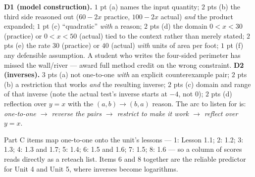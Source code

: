 \documentclass[10pt]{article}
\begin{document}
\begin{teachernote}
\textbf{D1 (model construction).} $1$ pt (a) names the input quantity;
$2$ pts (b) the third side reasoned out ($60 - 2x$ practice, $100 - 2x$ actual)
\emph{and} the product expanded; $1$ pt (c) ``quadratic'' \emph{with} a reason;
$2$ pts (d) the domain $0 < x < 30$ (practice) or $0 < x < 50$ (actual) tied to
the context rather than merely stated; $2$ pts (e) the rate $30$ (practice) or
$40$ (actual) \emph{with} units of area per foot; $1$ pt (f) any defensible
assumption. A student who writes the four-sided perimeter has missed the
wall/river --- award full method credit on the wrong constraint.
\smallskip
\textbf{D2 (inverses).} $3$ pts (a) not one-to-one \emph{with} an explicit
counterexample pair; $2$ pts (b) a restriction that works \emph{and} the
resulting inverse; $2$ pts (c) domain and range of that inverse (note the actual
test's inverse starts at $-4$, not $0$); $2$ pts (d) reflection over $y = x$
with the $(a,b) \to (b,a)$ reason. The arc to listen for is: \emph{one-to-one
$\to$ reverse the pairs $\to$ restrict to make it work $\to$ reflect over
$y = x$}.
\end{teachernote}

\begin{teachernote}
Part C items map one-to-one onto the unit's lessons --- 1: Lesson 1.1;
2: 1.2; 3: 1.3; 4: 1.3 and 1.7; 5: 1.4; 6: 1.5 and 1.6; 7: 1.5; 8: 1.6 --- so a
column of scores reads directly as a reteach list. Items 6 and 8 together are
the reliable predictor for Unit 4 and Unit 5, where inverses become logarithms.
\end{teachernote}
\end{document}

